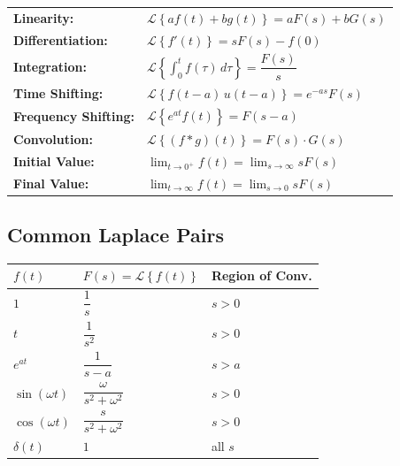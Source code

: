 \documentclass[12pt]{article}
\newcommand{\hcell}[1]{\textbf{\color{white}#1}}
\newcommand{\Lap}[1]{\mathcal{L}\!\left\{#1\right\}}
\begin{document}
\begin{conceptbox}
\begin{tabular}{lp{8cm}}
\textbf{Linearity:}         & $\Lap{af(t)+bg(t)} = aF(s)+bG(s)$ \\[4pt]
\textbf{Differentiation:}   & $\Lap{f'(t)} = sF(s) - f(0)$ \\[4pt]
\textbf{Integration:}       & $\displaystyle\Lap{\int_0^t f(\tau)\,d\tau} = \dfrac{F(s)}{s}$ \\[8pt]
\textbf{Time Shifting:}     & $\Lap{f(t-a)\,u(t-a)} = e^{-as}F(s)$ \\[4pt]
\textbf{Frequency Shifting:}& $\Lap{e^{at}f(t)} = F(s-a)$ \\[4pt]
\textbf{Convolution:}       & $\Lap{(f*g)(t)} = F(s)\cdot G(s)$ \\[4pt]
\textbf{Initial Value:}     & $\displaystyle\lim_{t\to 0^+} f(t) = \lim_{s\to\infty} sF(s)$ \\[8pt]
\textbf{Final Value:}       & $\displaystyle\lim_{t\to\infty} f(t) = \lim_{s\to 0} sF(s)$ \\
\end{tabular}
\end{conceptbox}

\subsection*{Common Laplace Pairs}

\begin{center}
\begin{tabular}{C{3.5cm} C{5cm} C{3cm}}
\toprule
{}
\hcell{$f(t)$} & \hcell{$F(s) = \Lap{f(t)}$} & \hcell{Region of Conv.} \\
\midrule
{}
$1$            & $\dfrac{1}{s}$                     & $s > 0$ \\[6pt]
$t$            & $\dfrac{1}{s^2}$                   & $s > 0$ \\[6pt]
$e^{at}$       & $\dfrac{1}{s-a}$                   & $s > a$ \\[6pt]
$\sin(\omega t)$ & $\dfrac{\omega}{s^2+\omega^2}$   & $s > 0$ \\[6pt]
$\cos(\omega t)$ & $\dfrac{s}{s^2+\omega^2}$        & $s > 0$ \\[6pt]
$\delta(t)$    & $1$                                & all $s$ \\
\bottomrule
\end{tabular}
\end{center}
\end{document}
